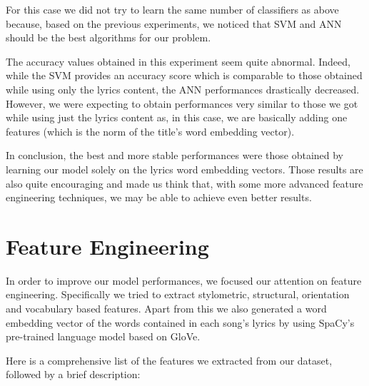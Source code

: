 For this case we did not try to learn the same number of classifiers as above because, based on the previous experiments, we noticed
that SVM and ANN should be the best algorithms for our problem. 

The accuracy values obtained in this experiment seem quite abnormal. Indeed,
while the SVM provides an accuracy score which is comparable to those obtained while using only the lyrics content, the ANN performances 
drastically decreased. However, we were expecting to obtain performances very similar to those we got while using just the lyrics content as, 
in  this case, we are basically adding one features (which is the norm of the title's word embedding vector).

In conclusion, the best and more stable performances were those obtained by learning our model solely on the lyrics word embedding vectors.
Those results are also quite encouraging and made us think that, with some more advanced feature engineering techniques,
we may be able to achieve even better results.

\section{Feature Engineering}
In order to improve our model performances, we focused our attention on feature engineering. Specifically we tried to extract stylometric, structural, orientation and vocabulary based features\cite{features}. Apart from this we also generated a word embedding vector of the words contained in each song's lyrics by using SpaCy's\cite{spacy} pre-trained language model based on GloVe\cite{glove}.\par

Here is a comprehensive list of the features we extracted from our dataset, followed by a brief description:

